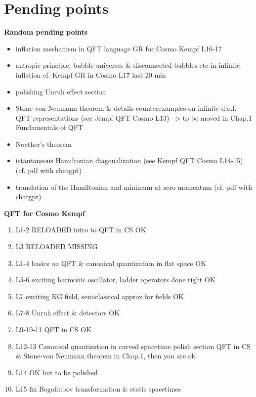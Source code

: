\chapter*{Pending points}




\noindent
\textbf{Random pending points}
\begin{itemize}
    \item inflation mechanism in QFT language GR for Cosmo Kempf L16-17
    \item antropic principle, bubble universes \& disconnected bubbles etc in infinite inflation cf. Kempf GR in Cosmo L17 last 20 min
    \item polishing Unruh effect section
    \item {\color{red} Stone-von Neumann theorem \& details-counterexamples on infinite d.o.f. QFT representations (see Jempf QFT Cosmo L13)} --> to be moved in Chap.1 Fundamentals of QFT
    \item Noether's theorem
    \item istantaneous Hamiltonian diagonalization (see Kempf QFT Cosmo L14-15) (cf. pdf with chatgpt)
    \item translation of the Hamiltonian and minimum at zero momentum (cf. pdf with chatgpt)
\end{itemize}




\noindent
\textbf{QFT for Cosmo Kempf}
\begin{enumerate}
    \item L1-2 RELOADED intro to QFT in CS {\color{blue} OK}
    \item L3 RELOADED {\color{red} MISSING}
    \item L1-4 basics on QFT \& canonical quantization in flat space  {\color{blue} OK}
    \item L5-6 exciting harmonic oscillator, ladder operators done right  {\color{blue} OK}
    \item L7 exciting KG field, semiclassical approx for fields {\color{blue} OK}
    \item L7-8 Unruh effect \& detectors {\color{blue} OK}
    \item L9-10-11 QFT in CS {\color{blue} OK}
    \item L12-13 Canonical quantization in curved spacetime {\color{red} polish section QFT in CS \& Stone-von Neumann theorem in Chap.1, then you are ok}
    \item L14 {\color{blue} OK \color{red} but to be polished}
    \item L15 {\color{red} fix Bogoliubov transformation \& statis spacetimes}
\end{enumerate}


